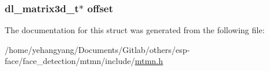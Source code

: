 \subsubsection[{\texorpdfstring{offset}{offset}}]{\setlength{\rightskip}{0pt plus 5cm}dl\+\_\+matrix3d\+\_\+t$\ast$ offset}\hypertarget{structmtmn__net__t_a0903a36fc3368901a05211a31007653b}{}\label{structmtmn__net__t_a0903a36fc3368901a05211a31007653b}


The documentation for this struct was generated from the following file\+:\begin{DoxyCompactItemize}
\item 
/home/yehangyang/\+Documents/\+Gitlab/others/esp-\/face/face\+\_\+detection/mtmn/include/\hyperlink{mtmn_8h}{mtmn.\+h}\end{DoxyCompactItemize}
